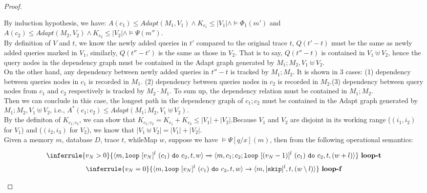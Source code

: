 \documentclass[a4paper,11pt]{article}
\begin{document}
\begin{proof}
\begin{itemize}
By induction hypothesis, we have:
$A(c_1) \leq Adapt(M_1, V_1) \land K_{c_1} \leq |V_1| \land \vDash \Phi_1(m')$ and 
$A(c_2) \leq Adapt(M_2, V_2)\land K_{c_2} \leq |V_2| \land \vDash \Psi(m'') $.
\\
By definition of $V$ and $t$, we know the newly added queries in $t'$ compared to the original trace $t$, $Q(t'-t)$ must be the same as newly added queries marked in
$V_1$, similarly, $Q(t''-t')$ is the same as those in $V_2$. That is to say, $Q(t''- t)$ is contained in $V_1 \uplus V_2$, hence the query nodes in the dependency graph must be contained in the Adapt graph generated by $M_1 ; M_2, V_1 \uplus V_2 $.\\

On the other hand, any dependency between newly added queries in $t'' - t$ is tracked by $M_1; M_2$. It is shown in $3$ cases: (1) dependency between queries nodes in $c_1$ is recorded in $M_1$. (2) dependency between queries nodes in $c_2$ is recorded in $M_2$.(3) dependency between query nodes from $c_1$ and $c_2$ respectively is tracked by $M_2 \cdot M_1$. To sum up,   
the dependency relation must be contained in $M_1 ; M_2$.
\\
Then we can conclude in this case, the longest path in the dependency graph of $c_1; c_2$ must be contained in the
Adapt graph generated by $M_1 ; M_2, V_1 \uplus V_2 $, i.e., $A^{*}(c_1; c_2) \leq Adapt(M_1 ; M_2, V_1 \uplus V_2)$.
\\
By the definiton of $K_{c_1; c_2}$, we can show that $K_{c_1;c_2}= K_{c_1}+K_{c_2} \leq |V_1| + |V_2|$.Because $V_1$ and $V_2$ are disjoint in its working range ($(i_1,i_2)$ for $V_1$) and ($(i_2,i_3)$ for $V_2$), we know that $ |V_1 \uplus V_2| = |V_1| + |V_2|  $.\\

Given a memory $m$, database $D$, trace $t$, whileMap $w$, suppose we have $\vDash \Psi[q/x](m)$, then from the following operational semantics:

\[
{\inferrule
{
 \valr_N > 0
}
{
\config{m, \eloop ~ [\valr_N]^{l} ~ (c_1) ~ \edo ~ c_2 ,  t, w }
\xrightarrow{} \config{m, c_1;c_2;  \eloop ~ [(\valr_N-1)]^{l} ~ (c_1) ~ \edo ~ c_2 ,  t, (w + l) }
}
~\textbf{loop-t}
}
\]
\[
{
\inferrule
{
 \valr_N = 0
}
{
\config{m,  \eloop ~ [\valr_N]^{l} ~ (c_1) ~ \edo ~ c_2 ,  t, w }
\xrightarrow{} \config{m, [\eskip]^{l} ,  t, (w \setminus l) }
}
~\textbf{loop-f}
}
\]

\end{itemize}
\end{proof}
\end{document}
